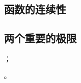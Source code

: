 \begin{Exercise}
  \begin{question}
    \item 
    \item 
    \item 
    \item 
  \end{question}
\end{Exercise}

\subsection{函数的连续性}
\begin{Practice}
  \begin{question}
    \item 
    \item 
  \end{question}
\end{Practice}


\begin{Practice}
  \begin{question}
    \item 
    \item 
    \item 
    \item 
  \end{question}
\end{Practice}

\subsection{两个重要的极限}
\begin{Practice}
  \begin{question}
    \item ；
    \item 。
  \end{question}
\end{Practice}

\begin{Exercise}
  \begin{question}
    \item 
    \item 
    \item 
    \item 
    \item 
    \item 
    \item 
  \end{question}
\end{Exercise}

